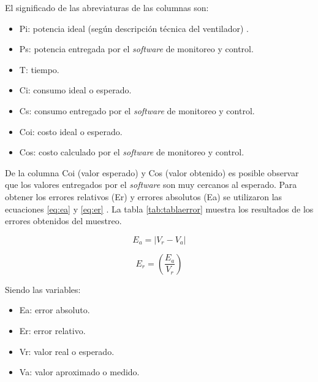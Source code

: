 \vspace{0.1cm}
El significado de las abreviaturas de las columnas son:
\begin{itemize}
\item Pi: potencia ideal (según descripción técnica del ventilador) .
\item Ps: potencia entregada por el \emph{software} de monitoreo y control.
\item T: tiempo.
\item Ci: consumo ideal o esperado.
\item Cs: consumo entregado por el \emph{software} de monitoreo y control.
\item Coi: costo ideal o esperado.
\item Cos: costo calculado por el \emph{software} de monitoreo y control.
\end{itemize}

\vspace{0.1cm}
De la columna Coi (valor esperado) y Cos (valor obtenido) es posible observar que los valores entregados por el \emph{software} son muy cercanos al esperado. Para obtener los errores relativos (Er) y errores absolutos (Ea) se utilizaron las ecuaciones  \ref{eq:ea} y \ref{eq:er} . La tabla \ref{tab:tablaerror} muestra los resultados de los errores obtenidos del muestreo.



\begin{equation}
	\label{eq:ea}
	E_a = \left| V_r - V_a \right|
\end{equation}

\begin{equation}
	\label{eq:er}
	E_r = \left( \frac{E_a}{V_r} \right)
\end{equation}

\vspace{1.0cm}
Siendo las variables:
\begin{itemize}
\item Ea: error absoluto. 
\item Er: error relativo.
\item Vr: valor real o esperado.
\item Va: valor aproximado o medido.
\end{itemize}

